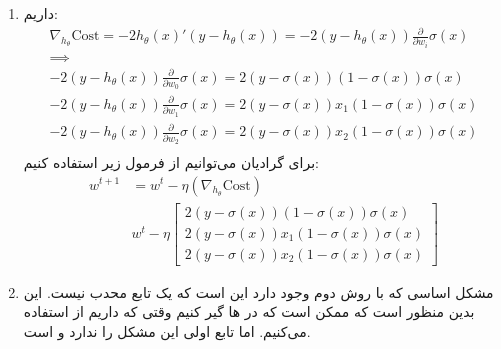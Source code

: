 \begin{enumerate}
    \item داریم:
    \begin{gather*}
        \nabla_{h_\theta} \text{Cost} = - 2 h_\theta(x)' (y - h_\theta(x)) = - 2 (y - h_\theta(x)) \frac{\partial}{\partial w_i} \sigma(x)\\
        \implies\\
        - 2 (y - h_\theta(x)) \frac{\partial}{\partial w_0} \sigma(x) = 2 (y - \sigma(x)) (1 - \sigma(x)) \sigma(x)\\
        - 2 (y - h_\theta(x)) \frac{\partial}{\partial w_1} \sigma(x) = 2 (y - \sigma(x)) x_1 (1 - \sigma(x)) \sigma(x)\\
        - 2 (y - h_\theta(x)) \frac{\partial}{\partial w_2} \sigma(x) = 2 (y - \sigma(x)) x_2 (1 - \sigma(x)) \sigma(x)\\
    \end{gather*}
    برای گرادیان می‌توانیم از فرمول زیر استفاده کنیم:
    \begin{align*}
        w^{t+1} &= w^t - \eta (\nabla_{h_\theta} \text{Cost})\\
        &w^t - \eta \begin{bmatrix}
            2 (y - \sigma(x)) (1 - \sigma(x)) \sigma(x)\\
            2 (y - \sigma(x)) x_1 (1 - \sigma(x)) \sigma(x)\\
            2 (y - \sigma(x)) x_2 (1 - \sigma(x)) \sigma(x)
        \end{bmatrix}
    \end{align*}
    \item مشکل اساسی که با روش دوم وجود دارد این است که یک تابع محدب نیست. این بدین منظور است
    که ممکن است که در
    ها
    گیر کنیم وقتی که داریم از
    استفاده می‌کنیم. اما تابع اولی این مشکل را ندارد و
    است.
\end{enumerate}